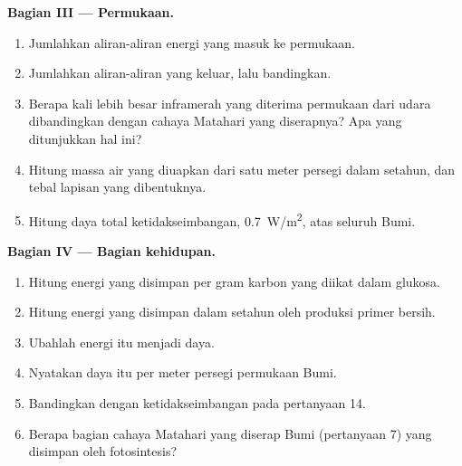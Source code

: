 \begin{problem}
\medskip
\noindent\textbf{Bagian III --- Permukaan.}
\begin{enumerate}[resume]
  \item Jumlahkan aliran-aliran energi yang masuk ke permukaan.
  \item Jumlahkan aliran-aliran yang keluar, lalu bandingkan.
  \item Berapa kali lebih besar inframerah yang diterima permukaan dari udara
        dibandingkan dengan cahaya Matahari yang diserapnya? Apa yang
        ditunjukkan hal ini?
  \item Hitung massa air yang diuapkan dari satu meter persegi dalam setahun,
        dan tebal lapisan yang dibentuknya.
  \item Hitung daya total ketidakseimbangan, \qty{0.7}{W/m^2}, atas seluruh
        Bumi.
\end{enumerate}

\medskip
\noindent\textbf{Bagian IV --- Bagian kehidupan.}
\begin{enumerate}[resume]
  \item Hitung energi yang disimpan per gram karbon yang diikat dalam glukosa.
  \item Hitung energi yang disimpan dalam setahun oleh produksi primer bersih.
  \item Ubahlah energi itu menjadi daya.
  \item Nyatakan daya itu per meter persegi permukaan Bumi.
  \item Bandingkan dengan ketidakseimbangan pada pertanyaan 14.
  \item Berapa bagian cahaya Matahari yang diserap Bumi (pertanyaan 7) yang
        disimpan oleh fotosintesis?
\end{enumerate}
\end{problem}
